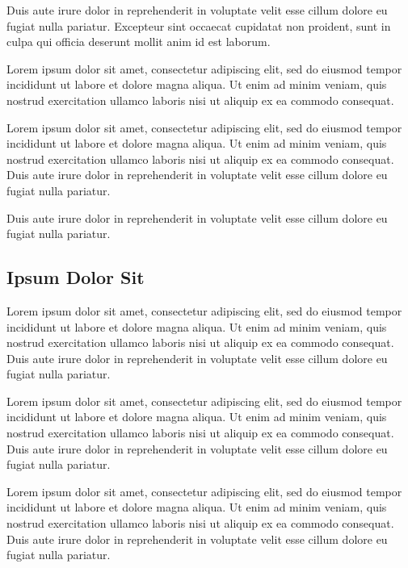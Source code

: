 Duis aute irure dolor in reprehenderit in voluptate velit esse cillum dolore eu fugiat nulla pariatur. Excepteur sint occaecat cupidatat non proident, sunt in culpa qui officia deserunt mollit anim id est laborum.


\begin{tcolorbox}[
	title={\textbf{Lorem Ipsum Dolor} \hfill \it{Exercise 1}},
	colback=gray!5,
	width=\textwidth,
	right=1cm, top=0.5cm, bottom=0.5cm
	]
	
	Lorem ipsum dolor sit amet, consectetur adipiscing elit, sed do eiusmod tempor incididunt ut labore et dolore magna aliqua. Ut enim ad minim veniam, quis nostrud exercitation ullamco laboris nisi ut aliquip ex ea commodo consequat. 
	
	Lorem ipsum dolor sit amet, consectetur adipiscing elit, sed do eiusmod tempor incididunt ut labore et dolore magna aliqua. Ut enim ad minim veniam, quis nostrud exercitation ullamco laboris nisi ut aliquip ex ea commodo consequat. Duis aute irure dolor in reprehenderit in voluptate velit esse cillum dolore eu fugiat nulla pariatur.
	
	Duis aute irure dolor in reprehenderit in voluptate velit esse cillum dolore eu fugiat nulla pariatur.

	
\end{tcolorbox}


\subsection*{Ipsum Dolor Sit}

Lorem ipsum dolor sit amet, consectetur adipiscing elit, sed do eiusmod tempor incididunt ut labore et dolore magna aliqua. Ut enim ad minim veniam, quis nostrud exercitation ullamco laboris nisi ut aliquip ex ea commodo consequat. Duis aute irure dolor in reprehenderit in voluptate velit esse cillum dolore eu fugiat nulla pariatur.

Lorem ipsum dolor sit amet, consectetur adipiscing elit, sed do eiusmod tempor incididunt ut labore et dolore magna aliqua. Ut enim ad minim veniam, quis nostrud exercitation ullamco laboris nisi ut aliquip ex ea commodo consequat. Duis aute irure dolor in reprehenderit in voluptate velit esse cillum dolore eu fugiat nulla pariatur.

Lorem ipsum dolor sit amet, consectetur adipiscing elit, sed do eiusmod tempor incididunt ut labore et dolore magna aliqua. Ut enim ad minim veniam, quis nostrud exercitation ullamco laboris nisi ut aliquip ex ea commodo consequat. Duis aute irure dolor in reprehenderit in voluptate velit esse cillum dolore eu fugiat nulla pariatur.

